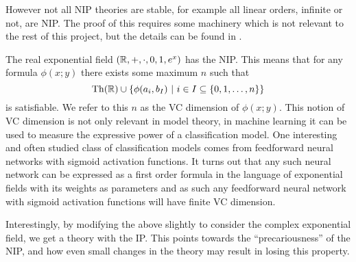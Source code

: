 However not
all NIP theories are stable, for example all linear orders, infinite or not, are NIP. The proof of
this requires some machinery which is not relevant to the rest of this project, but the details
can be found in \cite{simon15}.


\begin{exmp}
  The real exponential field $(\mathbb{R},+,\cdot,0,1,e^x)$ has the NIP. \cite{steinhorn1999} This means
  that for any formula $\phi(x;y)$ there exists some maximum $n$ such that
  \begin{equation*}
    \operatorname{Th}(\mathbb{R}) \cup \{\phi(a_i,b_I)\ |\ i \in I \subseteq \{0,1,\dots,n\}\}
  \end{equation*}
  is satisfiable. We refer to this $n$ as the VC dimension of $\phi(x;y)$. This notion of VC
  dimension is not only relevant in model theory, in machine learning it can be used to measure the
  expressive power of a classification model. One interesting and often studied class of
  classification models comes from feedforward neural networks with sigmoid activation functions. It
  turns out that any such neural network can be expressed as a first order formula in the language
  of exponential fields with its weights as parameters \cite{macintyre93} and as such any
  feedforward neural network with sigmoid activation functions will have finite VC dimension.
\end{exmp}

Interestingly, by modifying the above slightly to consider the complex exponential field, we get a
theory with the IP. This points towards the ``precariousness'' of the NIP, and how even small
changes in the theory may result in losing this property.

